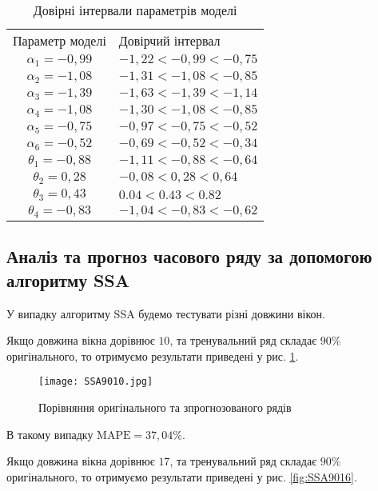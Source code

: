 \begin{table}[h]
\caption{Довірні інтервали параметрів моделі}\label{tab:ARIMA80}
\begin{tabular}{|c|m{}|}
\hline
Параметр моделі & Довірчий інтервал \\
		\hlinewd{2pt}
$\alpha_{1} = -0,99$ & $-1,22 < -0,99 < -0,75$ \\
\hline
$\alpha_{2} = -1,08$ & $-1,31 < -1,08 < -0,85$ \\
\hline
$\alpha_{3} = -1,39$ & $-1,63 < -1,39 < -1,14$ \\
\hline
$\alpha_{4} = -1,08$ & $-1,30 < -1,08 < -0,85$ \\
\hline
$\alpha_{5} = -0,75$ & $-0,97 < -0,75 < -0,52$ \\
\hline
$\alpha_{6} = -0,52$ & $-0,69 < -0,52 < -0,34$ \\
\hline
$\theta_{1} = -0,88$ & $-1,11 < -0,88 < -0,64$ \\
\hline
$\theta_{2} = 0,28$ & $-0,08 < 0,28 < 0,64$ \\
\hline
$\theta_{3} = 0,43$ & $0.04 < 0.43 < 0.82$ \\
\hline
$\theta_{4} = -0,83$ & $-1,04 < -0,83 < -0,62$ \\
\hline
\end{tabular}
\end{table}

\subsection{Аналіз та прогноз часового ряду за допомогою алгоритму SSA}

У випадку алгоритму SSA будемо тестувати різні довжини вікон.

Якщо довжина вікна дорівнює $10$, та тренувальний ряд складає $90\%$ оригінального, то отримуємо результати приведені у рис. \ref{fig:SSA9010}.

\vspace{1em}

\begin{figure}[h]
  \texttt{[image: SSA9010.jpg]}
  \caption{Порівняння оригінального та зпрогнозованого рядів}
  \label{fig:SSA9010}
\end{figure}

В такому випадку $\text{MAPE} = 37,04\%$.

Якщо довжина вікна дорівнює $17$, та тренувальний ряд складає $90\%$ оригінального, то отримуємо результати приведені у рис. \ref{fig:SSA9016}.


